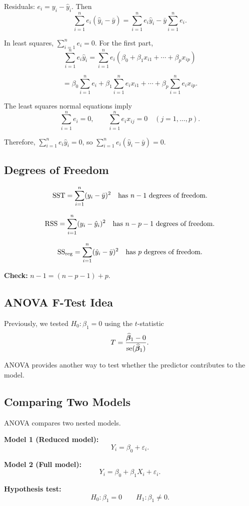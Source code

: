 Residuals: $e_i = y_i-\hat{y}_i$. Then
\[
\sum_{i=1}^{n} e_i(\hat{y}_i-\bar{y})
=
\sum_{i=1}^{n}e_i\hat{y}_i
-
\bar{y}\sum_{i=1}^{n}e_i.
\]

In least squares, $\sum_{i=1}^{n}e_i = 0$. For the first part,
\[
\sum_{i=1}^{n} e_i\hat{y}_i
=
\sum_{i=1}^{n} e_i
(\beta_0+\beta_1 x_{i1}+\cdots+\beta_p x_{ip})
\]

\[
=
\beta_0\sum_{i=1}^{n}e_i
+
\beta_1\sum_{i=1}^{n}e_i x_{i1}
+\cdots+
\beta_p\sum_{i=1}^{n}e_i x_{ip}.
\]

The least squares normal equations imply
\[
\sum_{i=1}^{n}e_i=0,
\qquad
\sum_{i=1}^{n}e_i x_{ij}=0 \quad (j=1,\dots,p).
\]

Therefore, $\sum_{i=1}^{n} e_i\hat{y}_i = 0$, so $\sum_{i=1}^{n}e_i(\hat{y}_i-\bar{y}) = 0$.

\subsection{Degrees of Freedom}

\[
\mathrm{SST}=\sum_{i=1}^{n}(y_i-\bar{y})^2
\quad\text{has } n-1 \text{ degrees of freedom}.
\]

\[
\mathrm{RSS}=\sum_{i=1}^{n}(y_i-\hat{y}_i)^2
\quad\text{has } n-p-1 \text{ degrees of freedom}.
\]

\[
\mathrm{SS}_{\mathrm{reg}}=\sum_{i=1}^{n}(\hat{y}_i-\bar{y})^2
\quad\text{has } p \text{ degrees of freedom}.
\]

\textbf{Check:} $n-1=(n-p-1)+p$.

\subsection{ANOVA F-Test Idea}

Previously, we tested $H_0:\beta_1=0$ using the $t$-statistic
\[
T=\frac{\widehat{\boldsymbol{\beta}}_1-0}{\mathrm{se}(\widehat{\boldsymbol{\beta}}_1)}.
\]

ANOVA provides another way to test whether the predictor contributes to the model.

\subsection{Comparing Two Models}

ANOVA compares two nested models.

\textbf{Model 1 (Reduced model):}
\[
Y_i=\beta_0+\varepsilon_i.
\]

\textbf{Model 2 (Full model):}
\[
Y_i=\beta_0+\beta_1 X_i+\varepsilon_i.
\]

\textbf{Hypothesis test:}
\[
H_0:\beta_1=0
\qquad
H_1:\beta_1\neq 0.
\]

